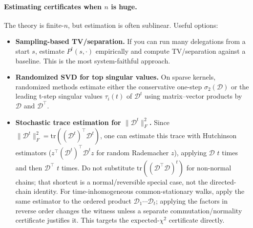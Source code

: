 \documentclass[11pt]{article}
\newcommand{\cD}{\mathcal{D}}
\begin{document}
\paragraph{Estimating certificates when $n$ is huge.}
The theory is finite-$n$, but estimation is often sublinear. Useful options:
\begin{itemize}[leftmargin=1.2em]
\item \textbf{Sampling-based TV/separation.} If you can run many delegations from a start $s$,
estimate $P^t(s,\cdot)$ empirically and compute TV/separation against a baseline. This is the most
system-faithful approach.
\item \textbf{Randomized SVD for top singular values.} On sparse kernels, randomized methods estimate either the conservative one-step $\sigma_2(\cD)$ or the leading t-step singular values $\tau_i(t)$ of $\cD^t$ using matrix--vector products by $\cD$ and $\cD^\top$.
\item \textbf{Stochastic trace estimation for $\|\cD^t\|_F^2$.} Since
$\|\cD^t\|_F^2=\mathrm{tr}((\cD^t)^\top\cD^t)$,
one can estimate this trace with Hutchinson estimators
($z^\top (\cD^t)^\top\cD^t z$ for random Rademacher $z$), applying $\cD$ $t$ times and then $\cD^\top$ $t$ times.
Do not substitute $\mathrm{tr}((\cD^\top\cD)^t)$ for non-normal chains; that shortcut is a normal/reversible special case, not the directed-chain identity.
For time-inhomogeneous common-stationary walks, apply the same estimator to the
ordered product $\cD_1\cdots\cD_t$; applying the factors in reverse order changes
the witness unless a separate commutation/normality certificate justifies it.
This targets the expected-$\chi^2$ certificate directly.

\end{itemize}
\end{document}
